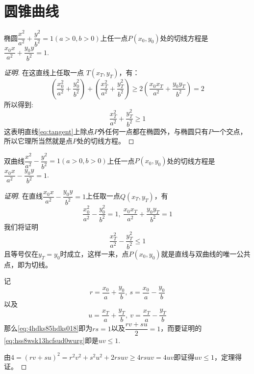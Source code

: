 
\section{圆锥曲线}
\label{sec:conic-section}

\begin{theorem}
  椭圆$\dfrac{x^2}{a^2}+\dfrac{y^2}{b^2}=1(a>0,b>0)$上任一点$P(x_0,y_0)$处的切线方程是$\dfrac{x_0x}{a^2}+\dfrac{y_0y}{b^2}=1$.
\end{theorem}

\begin{proof}[证明]
在这直线上任取一点 $T(x_T,y_T)$，有：
\begin{equation}
\left(\frac{x_0^2}{a^2}+\frac{y_0^2}{b^2}\right)+\left(\frac{x_T^2}{a^2}+\frac{y_T^2}{b^2}\right) \geqslant 2\left(\frac{x_0x_T}{a^2}+\frac{y_0y_T}{b^2}\right)=2
\end{equation}
所以得到:
\begin{equation}
\frac{x_T^2}{a^2}+\frac{y_T^2}{b^2} \geqslant 1
\end{equation}
这表明直线\ref{eq:tangent}上除点$P$外任何一点都在椭圆外，与椭圆只有$P$一个交点，所以它理所当然就是点$P$处的切线方程。
\end{proof}

\begin{theorem}
  双曲线$\dfrac{x^2}{a^2}-\dfrac{y^2}{b^2}=1(a>0,b>0)$上任一点$P(x_0,y_0)$处的切线方程是$\dfrac{x_0x}{a^2}-\dfrac{y_0y}{b^2}=1$.
\end{theorem}

\begin{proof}[证明]
  在直线$\dfrac{x_0x}{a^2}-\dfrac{y_0y}{b^2}=1$上任取一点$Q(x_T,y_T)$，有
  \begin{equation}
    \label{eq:4hdks85hdks018}
   \frac{x_0^2}{a^2}-\frac{y_0^2}{b^2}=1, \  \frac{x_0x_T}{a^2}+\frac{y_0y_T}{b^2}=1 
  \end{equation}
  我们将证明
  \begin{equation}
    \label{eq:hss8wsk13hcfsud0wurg}
    \frac{x_T^2}{a^2}-\frac{y_T^2}{b^2} \leqslant 1  
  \end{equation}
  且等号仅在$y_T=y_0$时成立，这样一来，点$P(x_0,y_0)$就是直线与双曲线的唯一公共点，即为切线。

  记
  \[ r=\frac{x_0}{a}+\frac{y_0}{b}, \  s=\frac{x_0}{a}-\frac{y_0}{b} \]
  以及
  \[ u=\frac{x_T}{a}+\frac{y_T}{b}, \  v=\frac{x_T}{a}-\frac{y_T}{b} \]
  那么\autoref{eq:4hdks85hdks018}即为$rs=1$以及$\dfrac{rv+su}{2}=1$，而要证明的\autoref{eq:hss8wsk13hcfsud0wurg}即是$uv\leqslant 1$.

  由$4=(rv+su)^2=r^2v^2+s^2u^2+2rsuv \geqslant 4rsuv= 4uv$即证得$uv \leqslant 1$，定理得证。
\end{proof}

